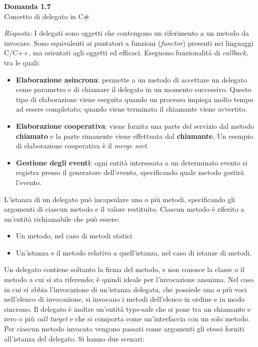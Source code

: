 \documentclass{article}
\newenvironment{problem}[2][Domanda]
    { \begin{mdframed}[backgroundcolor=gray!20] \textbf{#1 #2} \\}
    {  \end{mdframed}}
\newenvironment{solution}
    {\textit{Risposta:}}
    {}
\begin{document}
\begin{problem}{1.7}
Concetto di delegato in C\#
\end{problem}
\begin{solution}
I delegati sono oggetti che contengono un riferimento a un metodo da invocare.
\newline
Sono equivalenti ai puntatori a funzioni (\textit{functor}) presenti nei linguaggi C/C++, ma orientati agli oggetti ed efficaci.
\newline
Eseguono funzionalità di \textit{callback}, tra le quali:
\begin{itemize}
	\item \textbf{Elaborazione asincrona}: permette a un metodo di accettare un delegato come parametro e di chiamare il delegato in un momento successivo. Questo tipo di elaborazione viene eseguita quando un processo impiega molto tempo ad essere completato; quando viene terminato il chiamante viene avvertito.
	\item \textbf{Elaborazione cooperativa}: viene fornita una parte del servizio dal metodo \textbf{chiamato} e la parte rimanente viene effettuata dal \textbf{chiamante}.
	\newline
	Un esempio di elaborazione cooperativa è il \textit{merge sort}.
	\item \textbf{Gestione degli eventi}: ogni entità interessata a un determinato evento si registra presso il generatore dell'evento, specificando quale metodo gestirà l'evento.
\end{itemize}
L'istanza di un delegato può incapsulare uno o più metodi, specificando gli argomenti di ciascun metodo e il valore restituito.
Ciascun metodo è riferito a un'entità richiamabile che può essere:
\begin{itemize}
	\item Un metodo, nel caso di metodi statici
	\item Un'istanza e il metodo relativo a quell'istanza, nel caso di istanze di metodi.
\end{itemize}
Un delegato contiene soltanto la firma del metodo, e non conosce la classe o il metodo a cui si sta riferendo; è quindi ideale per l'invocazione anonima.
Nel caso in cui si abbia l'invocazione di un'istanza delegata, che possiede una o più voci nell'elenco di invocazione, si invocano i metodi dell'elenco in ordine e in modo sincrono.
Il delegato è inoltre un’entità type-safe che si pone tra un chiamante e zero o più \textit{call target} e che si comporta come
un’interfaccia con un solo metodo.
Per ciascun metodo invocato vengono passati come argomenti gli stessi forniti all'istanza del delegato. Si hanno due scenari:

\end{solution}
\end{document}

